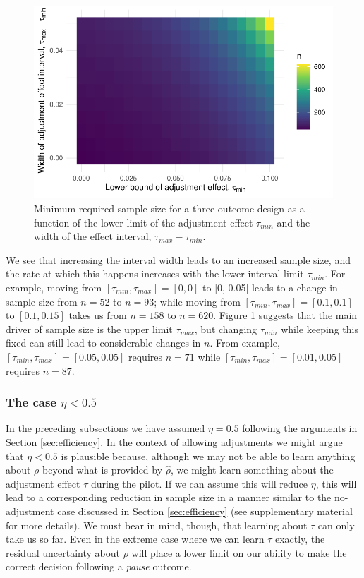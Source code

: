 \documentclass{bmcart}
\begin{document}
\begin{figure}
\centering
\includegraphics[scale=0.8]{./figures/tau_part_ns}
\caption{Minimum required sample size for a three outcome design as a function of the lower limit of the adjustment effect $\tau_{min}$ and the width of the effect interval, $\tau_{max} - \tau_{min}$.}
\label{fig:tau_part_ns}
\end{figure}

We see that increasing the interval width leads to an increased sample size, and the rate at which this happens increases with the lower interval limit $\tau_{min}$. For example, moving from $[\tau_{min}, \tau_{max}] = [0, 0]$ to [0, 0.05] leads to a change in sample size from $n = 52$ to $n = 93$; while moving from   $[\tau_{min}, \tau_{max}] = [0.1, 0.1]$ to $[0.1, 0.15]$ takes us from $n = 158$ to $n = 620$. Figure \ref{fig:tau_part_ns} suggests that the main driver of sample size is the upper limit $\tau_{max}$, but changing $\tau_{min}$ while keeping this fixed can still lead to considerable changes in $n$. From example, $[\tau_{min}, \tau_{max}] = [0.05, 0.05]$ requires $n = 71$ while $[\tau_{min}, \tau_{max}] = [0.01, 0.05]$ requires $n = 87$.

\subsubsection{The case $\eta < 0.5$}

In the preceding subsections we have assumed $\eta = 0.5$ following the arguments in Section \ref{sec:efficiency}. In the context of allowing adjustments we might argue that $\eta < 0.5$ is plausible because, although we may not be able to learn anything about $\rho$ beyond what is provided by $\hat{\rho}$, we might learn something about the adjustment effect $\tau$ during the pilot. If we can assume this will reduce $\eta$, this will lead to a corresponding reduction in sample size in a manner similar to the no-adjustment case discussed in Section \ref{sec:efficiency} (see supplementary material for more details). We must bear in mind, though, that learning about $\tau$ can only take us so far. Even in the extreme case where we can learn $\tau$ exactly, the residual uncertainty about $\rho$ will place a lower limit on our ability to make the correct decision following a \emph{pause} outcome.
\end{document}
